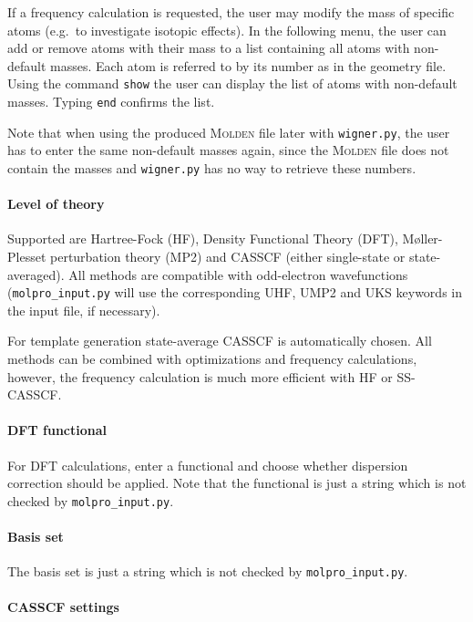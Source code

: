 \documentclass[a4paper,11pt,DIV=15,openany,twoside=false]{scrbook}
\newcommand{\ttt}[1]{\texttt{#1}}
\begin{document}
If a frequency calculation is requested, the user may modify the mass of specific atoms (e.g.\ to investigate isotopic effects). In the following menu, the user can add or remove atoms with their mass to a list containing all atoms with non-default masses. Each atom is referred to by its number as in the geometry file. Using the command \ttt{show} the user can display the list of atoms with non-default masses. Typing \ttt{end} confirms the list.

Note that when using the produced \textsc{Molden} file later with \ttt{wigner.py}, the user has to enter the same non-default masses again, since the \textsc{Molden} file does not contain the masses and \ttt{wigner.py} has no way to retrieve these numbers.

\paragraph{Level of theory}

Supported are Hartree-Fock (HF), Density Functional Theory (DFT), M{\o}ller-Plesset perturbation theory (MP2) and CASSCF (either single-state or state-averaged). All methods are compatible with odd-electron wavefunctions (\ttt{molpro\_input.py} will use the corresponding UHF, UMP2 and UKS keywords in the input file, if necessary).

For template generation state-average CASSCF is automatically chosen. All methods can be combined with optimizations and frequency calculations, however, the frequency calculation is much more efficient with HF or SS-CASSCF. 

\paragraph{DFT functional}

For DFT calculations, enter a functional and choose whether dispersion correction should be applied. Note that the functional is just a string which is not checked by \ttt{molpro\_input.py}. 

\paragraph{Basis set}

The basis set is just a string which is not checked by \ttt{molpro\_input.py}. 

\paragraph{CASSCF settings}
\end{document}

